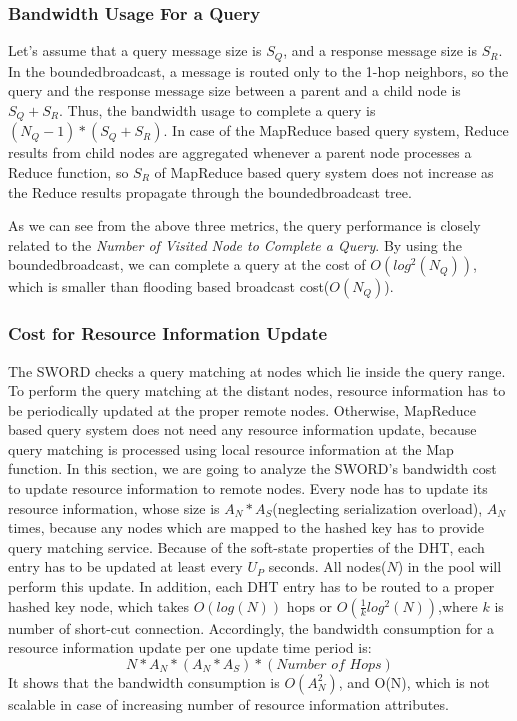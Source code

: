 \documentclass{acm_proc_article-sp}
\begin{document}
\subsubsection{Bandwidth Usage For a Query}
Let's assume that a query message size is $S_Q$, and a response message size is $S_R$.
In the boundedbroadcast, a message is routed only to the 1-hop neighbors, so the query and the response message size between a parent and a child node is $S_Q+S_R$.
Thus, the bandwidth usage to complete a query is \begin{math}(N_Q-1)*(S_Q+S_R)\end{math}.
In case of the MapReduce based query system, Reduce results from child nodes are aggregated whenever a parent node processes a Reduce function, so $S_R$ of MapReduce based query system does not increase
as the Reduce results propagate through the boundedbroadcast tree.

As we can see from the above three metrics, the query performance is closely related to the \textit{Number of Visited Node to Complete a Query}. By using the boundedbroadcast, we can complete a query
at the cost of \begin{math}O(log^2(N_Q))\end{math}, which is smaller than flooding based broadcast cost(\begin{math}O(N_Q)\end{math}).
\subsubsection{Cost for Resource Information Update}
The SWORD checks a query matching at nodes which lie inside the query range. To perform the query matching at the distant nodes, resource information has to be periodically updated at the proper remote nodes.
Otherwise, MapReduce based query system does not need any resource information update, because query matching is processed using local resource information at the Map function.
In this section, we are going to analyze the SWORD's bandwidth cost to update resource information to remote nodes.
Every node has to update its resource information, whose size is $A_N*A_S$(neglecting serialization overload), $A_N$ times, because any nodes which are mapped to the hashed key has to provide query matching service. 
Because of the soft-state properties of the DHT, each entry has to be updated at least every $U_P$ seconds. All nodes($N$) in the pool will perform this update.
In addition, each DHT entry has to be routed to a proper hashed key node, which takes $O(log(N))$ hops\cite{chord}\cite{pastry} or \begin{math}O(\frac{1}{k}log^2(N))\end{math},where $k$ is number of short-cut connection\cite{brunet}.
Accordingly, the bandwidth consumption for a resource information update per one update time period is:
\begin{displaymath}N*A_N*(A_N*A_S)*(\textit{Number of Hops})\end{displaymath}
It shows that the bandwidth consumption is $O(A_N^2)$, and O(N), which is not scalable in case of increasing number of resource information attributes.
\end{document}
